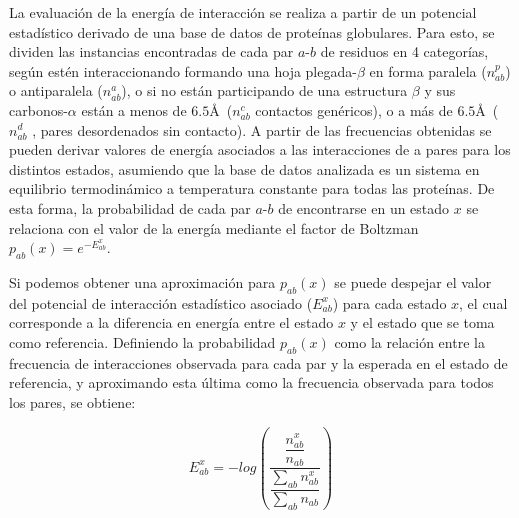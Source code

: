 La evaluación de la energía de interacción se realiza a partir de un potencial estadístico derivado de una base de datos de proteínas globulares.
Para esto, se dividen las instancias encontradas de cada par $a$-$b$ de residuos en 4 categorías, según estén interaccionando formando una hoja plegada-$\beta$ en forma paralela ($n_{ab}^p$) o antiparalela ($n_{ab}^a$), 
o si no están participando de una estructura $\beta$ y sus carbonos-$\alpha$ están a menos de $6.5$\AA~($n_{ab}^c$ contactos genéricos), o a más de $6.5$\AA~($n_{ab}^d$ , pares desordenados sin contacto). 
A partir de las frecuencias obtenidas se pueden derivar valores de energía asociados a las interacciones de a pares para los distintos estados, asumiendo que la base de datos analizada es un sistema en equilibrio termodinámico 
a temperatura constante para todas las proteínas.
De esta forma, la probabilidad de cada par $a$-$b$ de encontrarse en un estado $x$ se relaciona con el valor de la energía mediante el factor de Boltzman $p_{ab}(x)= e^{-E_{ab}^x}$. 

Si podemos obtener una aproximación para $p_{ab}(x)$ se puede despejar el valor del potencial de interacción estadístico asociado ($E_{ab}^x$) para cada estado $x$,
el cual corresponde a la diferencia en energía entre el estado $x$ y el estado que se toma como referencia.
Definiendo la probabilidad $p_{ab}(x)$ como la relación entre la frecuencia de interacciones observada para cada par y la esperada en el estado de referencia, 
y aproximando esta última como la frecuencia observada para todos los pares, se obtiene:

\begin{equation}
{E_{ab}^x = -log\left(\dfrac{\dfrac{n_{ab}^x}{n_{ab}}} {\dfrac{\sum\limits_{ab} n_{ab}^x}{\sum\limits_{ab} n_{ab}}}\right)}
\end{equation}


